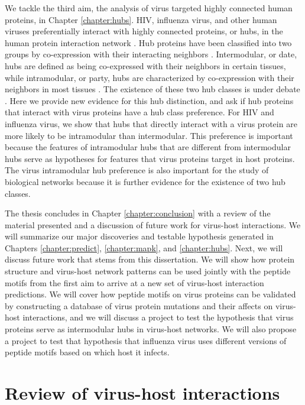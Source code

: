 We tackle the third aim, the analysis of virus targeted highly
connected human proteins, in Chapter \ref{chapter:hubs}. HIV,
influenza virus, and other human viruses preferentially interact with
highly connected proteins, or hubs, in the human protein interaction
network \cite{calderwood07, dyer08, dechassey08, tastan09}. Hub
proteins have been classified into two groups by co-expression with
their interacting neighbors \cite{taylor09}. Intermodular, or date,
hubs are defined as being co-expressed with their neighbors in certain
tissues, while intramodular, or party, hubs are characterized by
co-expression with their neighbors in most tissues
\cite{taylor09}. The existence of these two hub classes is under
debate \cite{taylor09,batada06,batada07,agarwal09,han04}. Here we
provide new evidence for this hub distinction, and ask if hub proteins
that interact with virus proteins have a hub class preference. For HIV
and influenza virus, we show that hubs that directly interact with a
virus protein are more likely to be intramodular than
intermodular. This preference is important because the features of
intramodular hubs that are different from intermodular hubs serve as
hypotheses for features that virus proteins target in host
proteins. The virus intramodular hub preference is also important for
the study of biological networks because it is further evidence for the
existence of two hub classes.

The thesis concludes in Chapter \ref{chapter:conclusion} with a review
of the material presented and a discussion of future work for
virus-host interactions. We will summarize our major discoveries and
testable hypothesis generated in Chapters \ref{chapter:predict},
\ref{chapter:mapk}, and \ref{chapter:hubs}. Next, we will discuss
future work that stems from this dissertation. We will show how
protein structure and virus-host network patterns can be used jointly
with the peptide motifs from the first aim to arrive at a new set of
virus-host interaction predictions. We will cover how peptide motifs
on virus proteins can be validated by constructing a database of virus
protein mutations and their affects on virus-host interactions, and we
will discuss a project to test the hypothesis that virus proteins
serve as intermodular hubs in virus-host networks. We will also
propose a project to test that hypothesis that influenza virus uses
different versions of peptide motifs based on which host it infects.

\section{Review of virus-host interactions}

